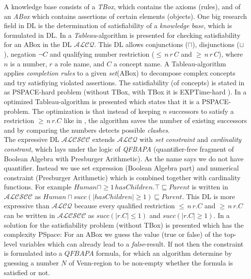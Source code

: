 \documentclass{book}
\theoremstyle{break}
\theoremstyle{definition}
\begin{document}
A knowledge base consists of a \textit{TBox}, which contains the axioms (rules), and of an \textit{ABox} which contains assertions of certain elements (objects). One big research field in DL is the determination of satisfiability of a \textit{knowledge base}, which is formulated in DL.  In \cite{1} a \textit{Tableau}-algorithm is presented for checking satisfiability for an ABox in the DL $\mathcal{ALCQ}$. This DL allows conjunctions ($\sqcap$), disjunctions ($\sqcup$), negation $\neg C$ and qualifying number restriction ($\leq\,n\,r\, C$ and $\geq \, n\, r\, C$), where $n$ is a number, $r$ a role name, and $C$ a concept name. A Tableau-algorithm applies \textit{completion rules} to a given \textit{set}(ABox) to decompose complex concepts and try satisfiying violated assertions. The satisfiability (of concepts) is stated in \cite{1} as PSPACE-hard problem (without TBox, with TBox it is EXPTime-hard \cite{4}). In \cite{pspace} a optimized Tableau-algorithm is presented which states that it is a PSPACE-problem. The optimization is that instead of keeping $n$ successors to satisfy a restriction $\geq\,n\,r.C$ like in \cite{1}, the algorithm saves the number of existing successors and by comparing the numbers detects possible \textit{clashes}.\\
The expressive DL $\mathcal{ALCSCC}$ extends $\mathcal{ALCQ}$ with \textit{set constraint} and \textit{cardinality constrant}, which lays under the logic of \textit{QFBAPA} (quantifier-free fragment of Boolean Algebra with Presburger Arithmetic). As the name says we do not have quantifier. Instead we use set expression (Boolean Algebra part) and numerical constraint (Presburger Arithmetic) which is combined together with cardinality functions. For example $Human\sqcap \geq 1\,hasChildren.\top\sqsubseteq Parent$ is written in $\mathcal{ALCSCC}$ as $Human\sqcap succ(|hasChildren|\geq 1)\sqsubseteq Parent$. This DL is more expressive than $\mathcal{ALCQ}$ because every qualified restriction $\leq\,n\,r.C$ and $\geq \, n\, r.C$ can be written in $\mathcal{ALCSCC}$ as $succ(|r.C|\leq 1)$ and $succ(|r.C|\geq 1)$. In \cite{4} a solution for the satisfiability problem (without TBox) is presented which has the complexity PSpace: For an ABox we guess the value (true or false) of the top-level variables which can already lead to a \textit{false}-result. If not then the constraint is formulated into a $QFBAPA$ formula, for which an algorithm determine by guessing a number $N$ of Venn-region to be non-empty whether the formula is satisfied or not.\\
\end{document}
